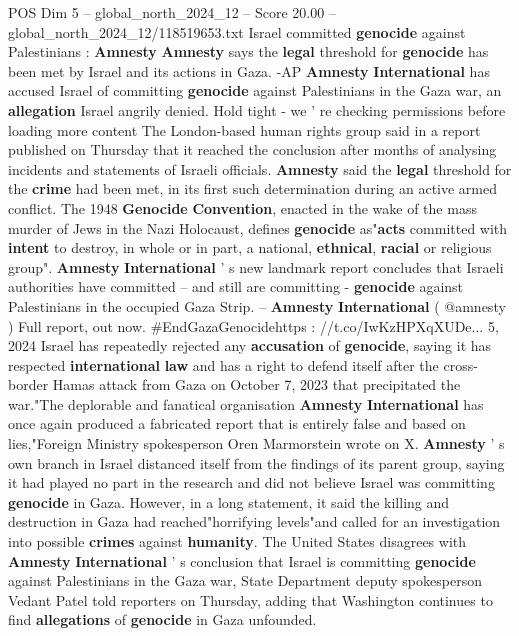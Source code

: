 \begin{textsample}{POS Dim 5 – global\_north\_2024\_12 – Score 20.00 – global\_north\_2024\_12/118519653.txt}  \label{ex:f5_pos_122}
Israel committed \textbf{genocide} against Palestinians : \textbf{Amnesty} \textbf{Amnesty} says the \textbf{legal} threshold for \textbf{genocide} has been met by Israel and its actions in Gaza. -AP \textbf{Amnesty} \textbf{International} has accused Israel of committing \textbf{genocide} against Palestinians in the Gaza war, an \textbf{allegation} Israel angrily denied.
Hold tight - we ' re checking permissions before loading more content The London-based human rights group said in a report published on Thursday that it reached the conclusion after months of analysing incidents and statements of Israeli officials. \textbf{Amnesty} said the \textbf{legal} threshold for the \textbf{crime} had been met, in its first such determination during an active armed conflict.
The 1948 \textbf{Genocide} \textbf{Convention}, enacted in the wake of the mass murder of Jews in the Nazi Holocaust, defines \textbf{genocide} as"\textbf{acts} committed with \textbf{intent} to destroy, in whole or in part, a national, \textbf{ethnical}, \textbf{racial} or religious group". \textbf{Amnesty} \textbf{International} ' s new landmark report concludes that Israeli authorities have committed -- and still are committing - \textbf{genocide} against Palestinians in the occupied Gaza Strip. -- \textbf{Amnesty} \textbf{International} ( @amnesty ) Full report, out now. \#EndGazaGenocidehttps : //t.co/IwKzHPXqXUDe... 5, 2024 Israel has repeatedly rejected any \textbf{accusation} of \textbf{genocide}, saying it has respected \textbf{international} \textbf{law} and has a right to defend itself after the cross-border Hamas attack from Gaza on October 7, 2023 that precipitated the war."The deplorable and fanatical organisation \textbf{Amnesty} \textbf{International} has once again produced a fabricated report that is entirely false and based on lies,"Foreign Ministry spokesperson Oren Marmorstein wrote on X. \textbf{Amnesty} ' s own branch in Israel distanced itself from the findings of its parent group, saying it had played no part in the research and did not believe Israel was committing \textbf{genocide} in Gaza.
However, in a long statement, it said the killing and destruction in Gaza had reached"horrifying levels"and called for an investigation into possible \textbf{crimes} against \textbf{humanity}.
The United States disagrees with \textbf{Amnesty} \textbf{International} ' s conclusion that Israel is committing \textbf{genocide} against Palestinians in the Gaza war, State Department deputy spokesperson Vedant Patel told reporters on Thursday, adding that Washington continues to find \textbf{allegations} of \textbf{genocide} in Gaza unfounded.

\end{textsample}
